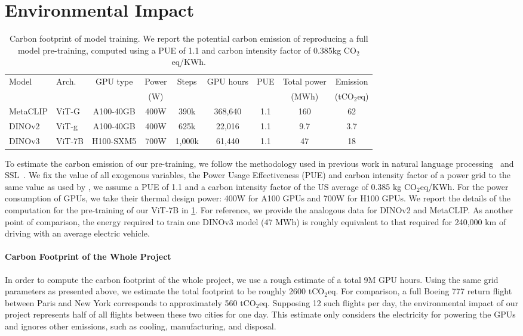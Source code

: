 \section{Environmental Impact}

\begin{table}[tb]
  \centering
  \caption{
    Carbon footprint of model training.
    We report the potential carbon emission of reproducing a full model pre-training, computed using a PUE of 1.1 and carbon intensity factor of 0.385kg CO$_2$eq/KWh.
  }
  \label{tab:carbon}
  \begin{tabular}{@{}ll ccccccc@{}}
    \toprule
    Model    & Arch.   & GPU type  & Power & Steps   & GPU hours   & PUE & Total power & Emission \\
             &         &           & (W)   &         &         &     & (MWh)       & (tCO$_2$eq)\\
    \midrule
    MetaCLIP & ViT-G  & A100-40GB & 400W  & 390k    & 368,640 & 1.1 & 160         & 62 \\
    DINOv2   & ViT-g    & A100-40GB & 400W  & 625k    & 22,016  & 1.1 & 9.7         & 3.7 \\
    DINOv3   & ViT-7B   & H100-SXM5 & 700W  & 1,000k  & 61,440  & 1.1 & 47          & 18 \\
    \bottomrule
  \end{tabular}
\end{table}

To estimate the carbon emission of our pre-training, we follow the methodology used in previous work in natural language processing~\citep{strubell2019energy,touvron2023llama} and SSL~\citep{oquab2024dinov2}.
We fix the value of all exogenous variables, \ie the Power Usage Effectiveness (PUE) and carbon intensity factor of a power grid to the same value as used by \citet{touvron2023llama}, \ie we assume a PUE of 1.1 and a carbon intensity factor of the US average of 0.385 kg CO$_2$eq/KWh.
For the power consumption of GPUs, we take their thermal design power: 400W for A100 GPUs and 700W for H100 GPUs.
We report the details of the computation for the pre-training of our ViT-7B in \cref{tab:carbon}.
For reference, we provide the analogous data for DINOv2 and MetaCLIP.
As another point of comparison, the energy required to train one DINOv3 model (47 MWh) is roughly equivalent to that required for 240,000 km of driving with an average electric vehicle. 

\paragraph{Carbon Footprint of the Whole Project}
In order to compute the carbon footprint of the whole project, we use a rough estimate of a total 9M GPU hours.
Using the same grid parameters as presented above, we estimate the total footprint to be roughly 2600 tCO$_2$eq.
For comparison, a full Boeing 777 return flight between Paris and New York corresponds to approximately 560 tCO$_2$eq.
Supposing 12 such flights per day, the environmental impact of our project represents half of all flights between these two cities for one day.
This estimate only considers the electricity for powering the GPUs and ignores other emissions, such as cooling, manufacturing, and disposal.
